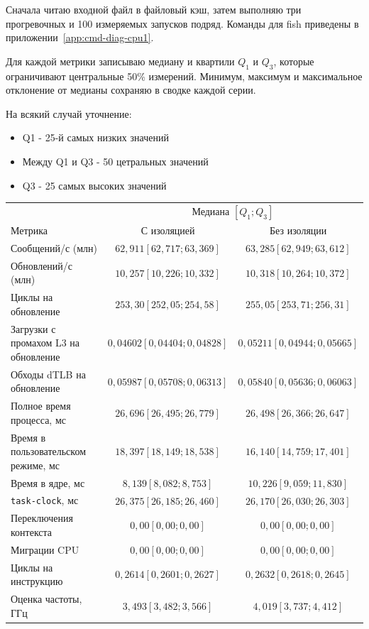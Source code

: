 \documentclass[a4paper,12pt]{article}
\begin{document}
Сначала читаю входной файл в файловый
кэш, затем выполняю три прогревочных и 100 измеряемых запусков подряд.
Команды для fish приведены в приложении~\ref{app:cmd-diag-cpu1}.

Для каждой метрики записываю медиану и квартили \(Q_1\) и \(Q_3\),
которые ограничивают центральные 50\% измерений. Минимум, максимум
и максимальное отклонение от медианы сохраняю в сводке каждой серии.

На всякий случай уточнение:
\begin{itemize}
    \item Q1 - 25-й самых низких значений
    \item Между Q1 и Q3 - 50 цетральных значений
    \item Q3 - 25 самых высоких значений
\end{itemize}

\begin{center}
\small
\setlength{\tabcolsep}{3pt}
\begin{tabular}{lcc}
\toprule
& \multicolumn{2}{c}{Медиана \([Q_1; Q_3]\)} \\
Метрика & С изоляцией & Без изоляции \\
\midrule
Сообщений/с (млн) & $62{,}911 [62{,}717; 63{,}369]$ & $63{,}285 [62{,}949; 63{,}612]$ \\
Обновлений/с (млн) & $10{,}257 [10{,}226; 10{,}332]$ & $10{,}318 [10{,}264; 10{,}372]$ \\
Циклы на обновление & $253{,}30 [252{,}05; 254{,}58]$ & $255{,}05 [253{,}71; 256{,}31]$ \\
Загрузки с промахом L3 на обновление & $0{,}04602 [0{,}04404; 0{,}04828]$ & $0{,}05211 [0{,}04944; 0{,}05665]$ \\
Обходы dTLB на обновление & $0{,}05987 [0{,}05708; 0{,}06313]$ & $0{,}05840 [0{,}05636; 0{,}06063]$ \\
Полное время процесса, мс & $26{,}696 [26{,}495; 26{,}779]$ & $26{,}498 [26{,}366; 26{,}647]$ \\
Время в пользовательском режиме, мс & $18{,}397 [18{,}149; 18{,}538]$ & $16{,}140 [14{,}759; 17{,}401]$ \\
Время в ядре, мс & $8{,}139 [8{,}082; 8{,}753]$ & $10{,}226 [9{,}059; 11{,}830]$ \\
\texttt{task-clock}, мс & $26{,}375 [26{,}185; 26{,}460]$ & $26{,}170 [26{,}030; 26{,}303]$ \\
Переключения контекста & $0{,}00 [0{,}00; 0{,}00]$ & $0{,}00 [0{,}00; 0{,}00]$ \\
Миграции CPU & $0{,}00 [0{,}00; 0{,}00]$ & $0{,}00 [0{,}00; 0{,}00]$ \\
Циклы на инструкцию & $0{,}2614 [0{,}2601; 0{,}2627]$ & $0{,}2632 [0{,}2618; 0{,}2645]$ \\
Оценка частоты, ГГц & $3{,}493 [3{,}482; 3{,}566]$ & $4{,}019 [3{,}737; 4{,}412]$ \\
\bottomrule
\end{tabular}
\end{center}
\end{document}

